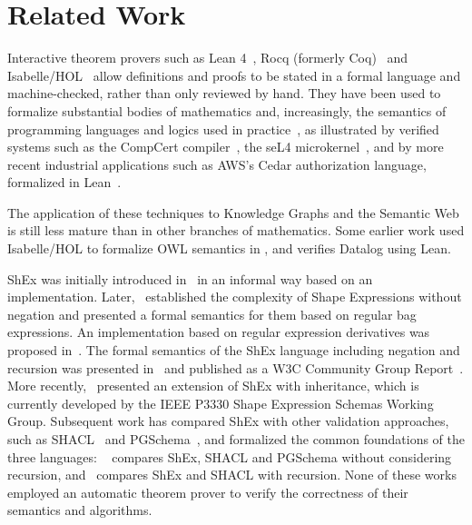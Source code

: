 \section{Related Work} \label{sec:related_work}

Interactive theorem provers such as 
 Lean 4~\cite{Moura2021}, 
 Rocq (formerly Coq)~\cite{rocq-reference-manual}
and 
 Isabelle/HOL~\cite{PaulsonNipkowWenzel2019} allow definitions 
 and proofs to be stated in a formal
language and machine-checked, rather than only reviewed by hand. 
They have
been used to formalize substantial bodies of mathematics and, increasingly,
the semantics of programming languages and logics used in practice~\cite{HuangEtAl2026}, 
as illustrated by verified systems such as 
the CompCert compiler~\cite{Leroy2009CompCert,Leroy2012MechanizedSemantics}, 
the seL4 microkernel~\cite{KleinEtAl2009}, 
and by more recent industrial applications such as AWS's Cedar authorization language, 
formalized in Lean~\cite{CutlerEtAl2024}.

The application of these techniques to Knowledge Graphs and the Semantic Web is still less mature than in other branches of mathematics.
Some earlier work used Isabelle/HOL to formalize OWL semantics
 in \cite{TurnerCarrol07}, and
 \cite{tantow_et_al:LIPIcs.ITP.2025.36} verifies Datalog using Lean.

ShEx was initially introduced in~\cite{PGS14} in an informal way based on an implementation. 
Later,~\cite{SBG15} established the complexity of Shape Expressions without negation 
and presented a formal semantics for them based on regular bag expressions. An implementation based on regular expression derivatives was proposed in~\cite{labragayo2015towards}.
 The formal semantics of the ShEx language including negation and recursion was presented in~\cite{BGP17} 
  and published as a W3C Community Group Report~\cite{shex_standard}. 
 More recently,~\cite{ShExInheritance} presented an extension of ShEx with inheritance,
  which is currently developed by the IEEE P3330 Shape Expression Schemas Working Group.
  Subsequent work has compared ShEx with other validation approaches,
 such as SHACL~\cite{SHACL} and PGSchema~\cite{ABDF23},
 and formalized the common foundations of the three languages:
  ~\cite{www25} compares ShEx, SHACL and PGSchema without considering recursion,
  and~\cite{recursive_shapes} compares ShEx and SHACL with recursion. None of these works employed an automatic theorem prover to verify
  the correctness of their semantics and algorithms.
